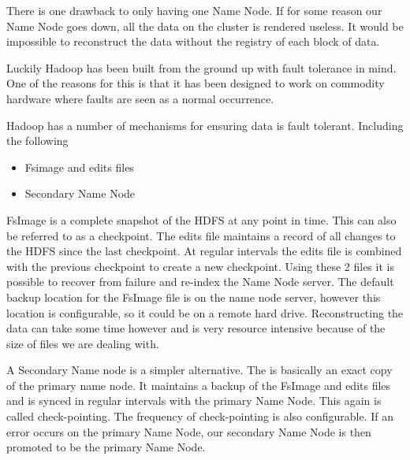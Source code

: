 There is one drawback to only having one Name Node. If for some reason our Name Node goes down, all the data on the cluster is rendered useless. It would be impossible to reconstruct the data without the registry of each block of data. 

Luckily Hadoop has been built from the ground up with fault tolerance in mind. One of the reasons for this is that it has been designed to work on commodity hardware where faults are seen as a normal occurrence.

Hadoop has a number of mechanisms for ensuring data is fault tolerant. Including the following

\begin{itemize}
\item Fsimage and edits files
\item Secondary Name Node
\end{itemize}

FsImage is a complete snapshot of the HDFS at any point in time. This can also be referred to as a checkpoint. The edits file maintains a record of all changes to the HDFS since the last checkpoint. At regular intervals the edits file is combined with the previous checkpoint to create a new checkpoint. Using these 2 files it is possible to recover from failure and re-index the Name Node server. The default backup location for the FsImage file is on the name node server, however this location is configurable, so it could be on a remote hard drive. Reconstructing the data can take some time however and is very resource intensive because of the size of files we are dealing with.

A Secondary Name node is a simpler alternative. The is basically an exact copy of the primary name node. It maintains a backup of the FsImage and edits files and is synced in regular intervals with the primary Name Node. This again is called check-pointing. The frequency of check-pointing is also configurable. If an error occurs on the primary Name Node, our secondary Name Node is then promoted to be the primary Name Node.

